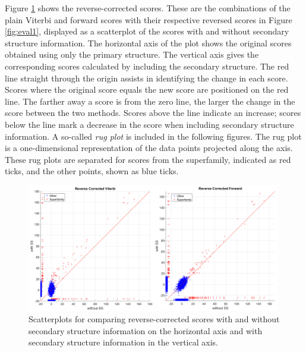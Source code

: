  


 
 
 
Figure \ref{fig:eval1_revCorr} shows the reverse-corrected scores. 
These are the combinations of the plain Viterbi and forward scores with their respective reversed scores in Figure \ref{fig:eval1}, displayed as a scatterplot of the scores with and without secondary structure information. The horizontal axis of the plot shows the original scores obtained using only the primary structure. The vertical axis gives the corresponding scores calculated by including the secondary structure. The red line straight through the origin assists in identifying the change in each score. Scores where the original score equals the new score are positioned on the red line. The farther away a score is from the zero line, the larger the change in the score between the two methods. Scores above the line indicate an increase; scores below the line mark a decrease in the score when including secondary structure information.  
A so-called \textit{rug plot} is included in the following figures. The rug plot is a one-dimensional representation of the data points projected along the axis. These rug plots are separated for scores from the superfamily, indicated as red ticks, and the other points, shown as blue ticks.  

 \begin{figure}[h!]
	\begin{center}
		\includegraphics[width=0.99\textwidth]{fig/corr_4}
	\end{center}
	\caption[Scatterplots for comparing reverse-corrected scores with and without secondary structure information.]{Scatterplots for comparing reverse-corrected scores with and without secondary structure information on the horizontal axis and with secondary structure information in the vertical axis. }
	\label{fig:eval1_revCorr}
\end{figure}



